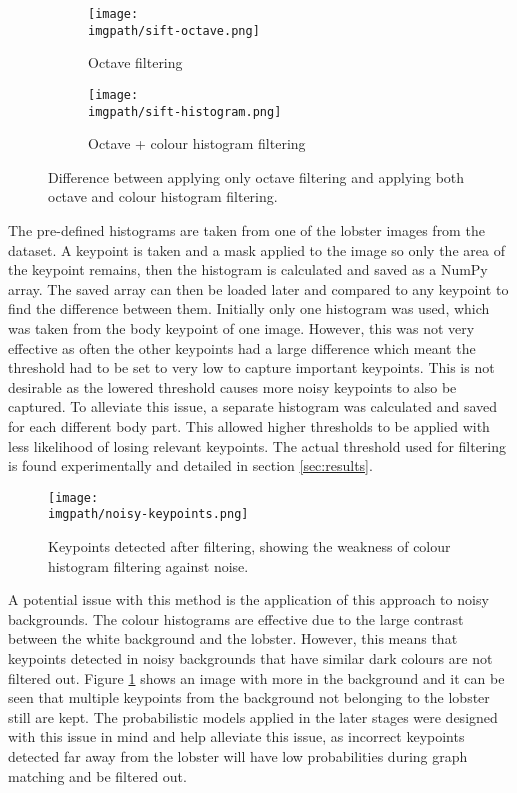 \begin{figure}[H]
	\begin{subfigure}{0.5\textwidth}
	\texttt{[image: \\imgpath/sift-octave.png]}
	\caption{Octave filtering}
	\end{subfigure}
	\hspace*{\fill}
	\begin{subfigure}{0.5\textwidth}
	\texttt{[image: \\imgpath/sift-histogram.png]}
	\caption{Octave + colour histogram filtering}
	\end{subfigure}
\caption{Difference between applying only octave filtering and applying both octave and colour histogram filtering.}
\end{figure}
\noindent
The pre-defined histograms are taken from one of the lobster images from the dataset. A keypoint is taken and a mask applied to the image so only the area of the keypoint remains, then the histogram is calculated and saved as a NumPy array. The saved array can then be loaded later and compared to any keypoint to find the difference between them. Initially only one histogram was used, which was taken from the body keypoint of one image. However, this was not very effective as often the other keypoints had a large difference which meant the threshold had to be set to very low to capture important keypoints. This is not desirable as the lowered threshold causes more noisy keypoints to also be captured. To alleviate this issue, a separate histogram was calculated and saved for each different body part. This allowed higher thresholds to be applied with less likelihood of losing relevant keypoints. The actual threshold used for filtering is found experimentally and detailed in section \ref{sec:results}.
\begin{figure}[H]
\centering
\texttt{[image: \\imgpath/noisy-keypoints.png]}
\caption{Keypoints detected after filtering, showing the weakness of colour histogram filtering against noise.}
\label{fig:noisy-histogram}
\end{figure}
\noindent
A potential issue with this method is the application of this approach to noisy backgrounds. The colour histograms are effective due to the large contrast between the white background and the lobster. However, this means that keypoints detected in noisy backgrounds that have similar dark colours are not filtered out. Figure \ref{fig:noisy-histogram} shows an image with more in the background and it can be seen that multiple keypoints from the background not belonging to the lobster still are kept. The probabilistic models applied in the later stages were designed with this issue in mind and help alleviate this issue, as incorrect keypoints detected far away from the lobster will have low probabilities during graph matching and be filtered out. 

